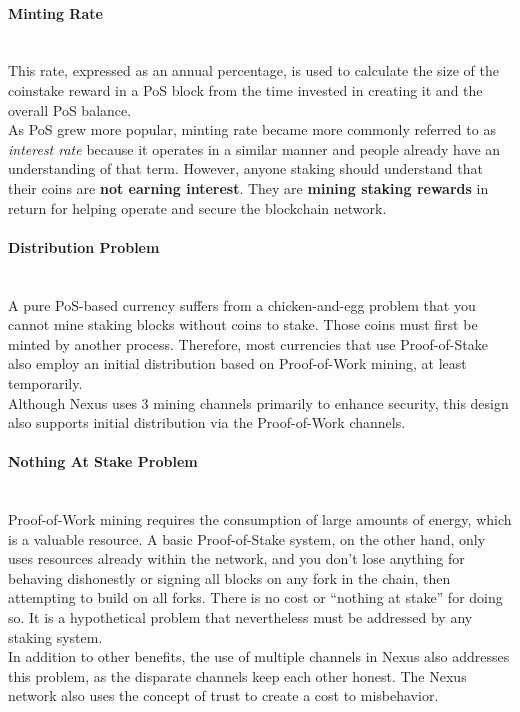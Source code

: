 \documentclass[11pt]{article}
\begin{document}
\paragraph{Minting Rate} ~\\
This rate, expressed as an annual percentage, is used to calculate the size of the coinstake reward in a PoS block from the time invested in creating it and the overall PoS balance. \\

\noindent As PoS grew more popular, minting rate became more commonly referred to as \textit{interest rate} because it operates in a similar manner and people already have an understanding of that term. However, anyone staking should understand that their coins are \textbf{not earning interest}. They are \textbf{mining staking rewards} in return for helping operate and secure the blockchain network.

\paragraph{Distribution Problem} ~\\
A pure PoS-based currency suffers from a chicken-and-egg problem that you cannot mine staking blocks without coins to stake. Those coins must first be minted by another process. Therefore, most currencies that use Proof-of-Stake also employ an initial distribution based on Proof-of-Work mining, at least temporarily.\\

\noindent Although Nexus uses 3 mining channels primarily to enhance security, this design also supports initial distribution via the Proof-of-Work channels.

\paragraph{Nothing At Stake Problem} ~\\
Proof-of-Work mining requires the consumption of large amounts of energy, which is a valuable resource. A basic Proof-of-Stake system, on the other hand, only uses resources already within the network, and you don’t lose anything for behaving dishonestly or signing all blocks on any fork in the chain, then attempting to build on all forks. There is no cost or “nothing at stake” for doing so. It is a hypothetical problem that nevertheless must be addressed by any staking system.\\

\noindent In addition to other benefits, the use of multiple channels in Nexus also addresses this problem, as the disparate channels keep each other honest. The Nexus network also uses the concept of trust to create a cost to misbehavior. 
\end{document}
